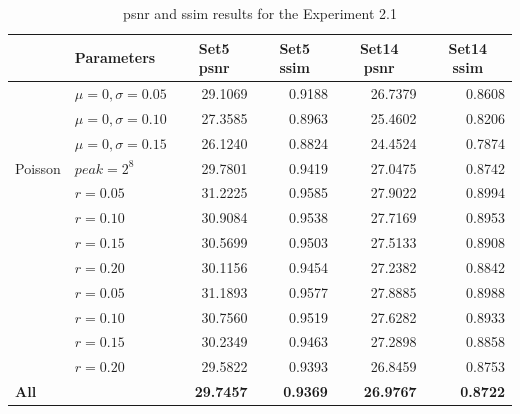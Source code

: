 \begin{table}[]
	\centering
	\begin{tabular}{|l|l|r|r|r|r|}
		\hline
		\rowcolor[HTML]{EFEFEF} 
		\multicolumn{1}{|c|}{\cellcolor[HTML]{EFEFEF}\textbf{Noise}} & \textbf{Parameters} & \multicolumn{1}{c|}{\cellcolor[HTML]{EFEFEF}\textbf{Set5 \gls{psnr}}} & \multicolumn{1}{c|}{\cellcolor[HTML]{EFEFEF}\textbf{Set5 \gls{ssim}}} & \multicolumn{1}{c|}{\cellcolor[HTML]{EFEFEF}\textbf{Set14 \gls{psnr}}} & \multicolumn{1}{c|}{\cellcolor[HTML]{EFEFEF}\textbf{Set14 \gls{ssim}}} \\ \hline
		\rowcolor[HTML]{FFFFFF} 
		\cellcolor[HTML]{EFEFEF} & $\mu=0, \sigma=0.05$ & 29.1069 & 0.9188 & 26.7379 & 0.8608 \\
		\rowcolor[HTML]{EFEFEF} 
		\cellcolor[HTML]{EFEFEF} & $\mu=0, \sigma=0.10$ & 27.3585 & 0.8963 & 25.4602 & 0.8206 \\
		\rowcolor[HTML]{FFFFFF} 
		\multirow{-3}{*}{\cellcolor[HTML]{EFEFEF}Gaussian} & $\mu=0, \sigma=0.15$ & 26.1240 & 0.8824 & 24.4524 & 0.7874 \\
		\rowcolor[HTML]{EFEFEF} 
		Poisson & $peak=2^8$ & 29.7801 & 0.9419 & 27.0475 & 0.8742 \\
		\rowcolor[HTML]{FFFFFF} 
		\cellcolor[HTML]{EFEFEF} & $r=0.05$ & 31.2225 & 0.9585 & 27.9022 & 0.8994 \\
		\rowcolor[HTML]{EFEFEF} 
		\cellcolor[HTML]{EFEFEF} & $r=0.10$ & 30.9084 & 0.9538 & 27.7169 & 0.8953 \\
		\rowcolor[HTML]{FFFFFF} 
		\cellcolor[HTML]{EFEFEF} & $r=0.15$ & 30.5699 & 0.9503 & 27.5133 & 0.8908 \\
		\rowcolor[HTML]{EFEFEF} 
		\multirow{-4}{*}{\cellcolor[HTML]{EFEFEF}Salt-and-pepper} & $r=0.20$ & 30.1156 & 0.9454 & 27.2382 & 0.8842 \\
		\rowcolor[HTML]{FFFFFF} 
		\cellcolor[HTML]{EFEFEF} & $r=0.05$ & 31.1893 & 0.9577 & 27.8885 & 0.8988 \\
		\rowcolor[HTML]{EFEFEF} 
		\cellcolor[HTML]{EFEFEF} & $r=0.10$ & 30.7560 & 0.9519 & 27.6282 & 0.8933 \\
		\rowcolor[HTML]{FFFFFF} 
		\cellcolor[HTML]{EFEFEF} & $r=0.15$ & 30.2349 & 0.9463 & 27.2898 & 0.8858 \\
		\rowcolor[HTML]{EFEFEF} 
		\multirow{-4}{*}{\cellcolor[HTML]{EFEFEF}Uniform} & $r=0.20$ & 29.5822 & 0.9393 & 26.8459 & 0.8753 \\
		\rowcolor[HTML]{FFFFFF} 
		\textbf{All} &  & \textbf{29.7457} & \textbf{0.9369} & \textbf{26.9767} & \textbf{0.8722}
	\end{tabular}
	\caption{\gls{psnr} and \gls{ssim} results for the Experiment 2.1}
	\label{tab:experiment21}
\end{table}

